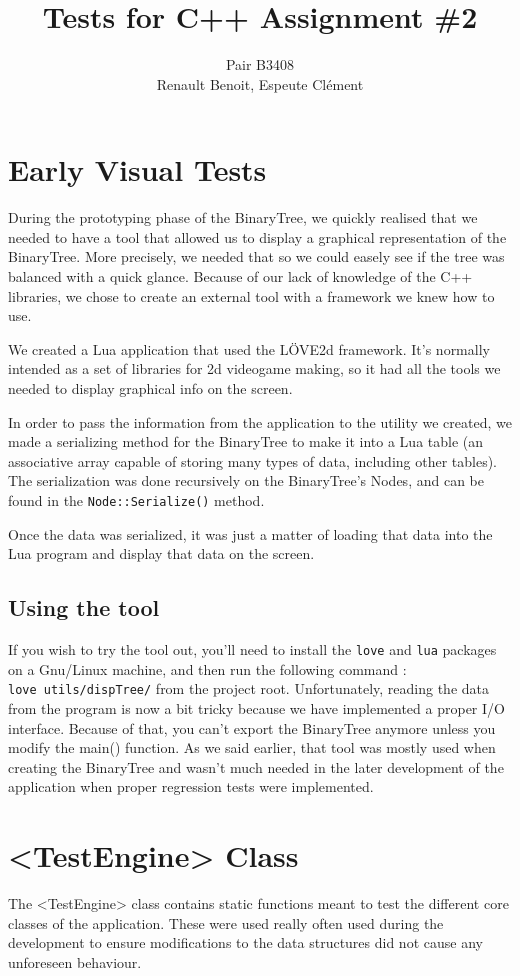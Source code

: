 \documentclass[10pt]{article}
\title{Tests for C++ Assignment \#2}
\author{Pair B3408 \\ {\sc Renault} Benoit, {\sc Espeute} Clément}
\date{}
\begin{document}
\pagestyle{fancy}
\maketitle

\section{Early Visual Tests}
During the prototyping phase of the BinaryTree, we quickly realised that we needed to have a tool that allowed us to display a graphical representation of the BinaryTree. More precisely, we needed that so we could easely see if the tree was balanced with a quick glance. Because of our lack of knowledge of the C++ libraries, we chose to create an external tool with a framework we knew how to use.

We created a Lua application that used the LÖVE2d framework. It's normally intended as a set of libraries for 2d videogame making, so it had all the tools we needed to display graphical info on the screen.

In order to pass the information from the application to the utility we created, we made a serializing method for the BinaryTree to make it into a Lua table (an associative array capable of storing many types of data, including other tables). The serialization was done recursively on the BinaryTree's Nodes, and can be found in the \texttt{Node::Serialize()} method.

Once the data was serialized, it was just a matter of loading that data into the Lua program and display that data on the screen.

\subsection*{Using the tool}
If you wish to try the tool out, you'll need to install the \texttt{love} and \texttt{lua} packages on a Gnu/Linux machine, and then run the following command : \texttt{love~utils/dispTree/} from the project root. Unfortunately, reading the data from the program is now a bit tricky because we have implemented a proper I/O interface. Because of that, you can't export the BinaryTree anymore unless you modify the main() function. As we said earlier, that tool was mostly used when creating the BinaryTree and wasn't much needed in the later development of the application when proper regression tests were implemented.

\section{<TestEngine> Class}
The <TestEngine> class contains static functions meant to test the different core classes of the application. These were used really often used during the development to ensure modifications to the data structures did not cause any unforeseen behaviour.
\end{document}
